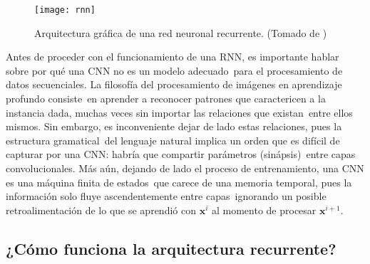 \begin{figure}
  \centering
  \texttt{[image: rnn]}
  \caption{Arquitectura gráfica de una red neuronal recurrente.
    (Tomado de \cite{goodfellow-et-al-2016})}
  \label{convnet_fig}
\end{figure}

Antes de proceder con el funcionamiento de una RNN, es importante hablar sobre por qué una CNN no es un modelo adecuado\
para el procesamiento de datos secuenciales. La filosofía del procesamiento de imágenes en aprendizaje profundo consiste\
en aprender a reconocer patrones que caractericen a la instancia dada, muchas veces sin importar las relaciones que existan\
entre ellos mismos. Sin embargo, es inconveniente dejar de lado estas relaciones, pues la estructura gramatical\
del lenguaje natural implica un orden que es difícil de capturar por una CNN: habría que compartir parámetros (sinápsis)\
entre capas convolucionales. Más aún, dejando de lado el proceso de entrenamiento, una CNN es una máquina finita de estados\
que carece de una memoria temporal, pues la información solo fluye ascendentemente entre capas\
ignorando un posible retroalimentación de lo que se aprendió con $\mathbf{x}^i$ al momento de procesar $\mathbf{x}^{i+1}$.

\subsection{¿Cómo funciona la arquitectura recurrente?}

